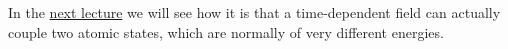 In the \href{https://www.authorea.com/326506/emMDRkXxtm44IKqpCtDi6g}{next lecture} we will see how it is that a time-dependent field can actually couple two atomic states, which are normally of very different energies.